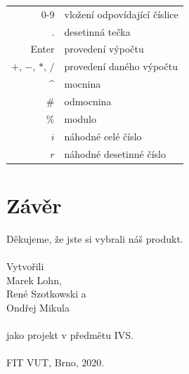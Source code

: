 \documentclass[a4paper, 11pt]{article}
\begin{document}
\begin{tabular}{r l}
    0-9 & vložení odpovídající číslice \\
    $.$ & desetinná tečka \\
    Enter & provedení výpočtu \\
    $+$, $-$, $*$, $/$ & provedení daného výpočtu \\
    \^{} & mocnina \\
    $\#$ & odmocnina \\
    $\%$ & modulo \\
    $i$  & náhodné celé číslo \\
    $r$  & náhodné desetinné číslo \\
\end{tabular}

\section{Závěr}

Děkujeme, že jste si vybrali náš produkt.\\
\\
\noindent
Vytvořili\\Marek Lohn,\\René Szotkowski a\\Ondřej Mikula\\\\jako projekt v předmětu IVS.\\\\
FIT VUT, Brno, 2020.
\end{document}
